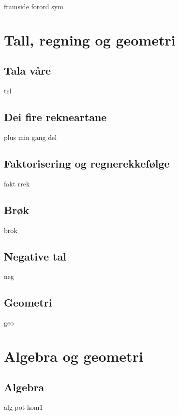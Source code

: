 




{framside}
{forord}
{sym}
\newpage

{\footnotesize \tableofcontents}
\newpage
\part{Tall, regning og geometri}

\chapter{Tala våre \label{Talavare}}
\newpage
{tel}
%
\chapter{Dei fire rekneartane \label{Rekneartane}}
\newpage
{plus}
{min}
{gang}
{del}
\chapter{Faktorisering og regnerekkefølge}
\newpage
{fakt}
{rrek}

\chapter{Brøk}
\newpage
{brok}

\chapter{Negative tal \label{Negtal}}
\newpage
{neg}


\chapter{Geometri}
\newpage
{geo}

\part{Algebra og geometri \label{Del2}}
\chapter{Algebra}
\newpage
{alg}
{pot}
\newpage
{kom1}

